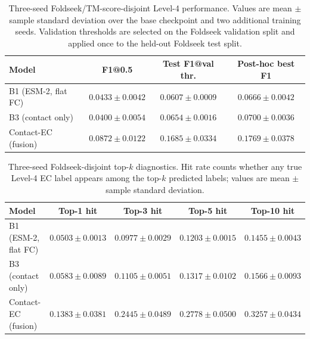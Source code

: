 \documentclass[11pt,a4paper]{article}
\begin{document}
\begin{table}[htbp]
\centering
\caption{Three-seed Foldseek/TM-score-disjoint Level-4 performance. Values are
mean $\pm$ sample standard deviation over the base checkpoint and two additional
training seeds. Validation thresholds are selected on the Foldseek validation
split and applied once to the held-out Foldseek test split.}
\label{tab:foldseek_seed_repeats}
\small
\setlength{\tabcolsep}{4pt}
\begin{tabular}{lccc}
\toprule
Model & F1@0.5 & Test F1@val thr. & Post-hoc best F1 \\
\midrule
B1 (ESM-2, flat FC) & $0.0433\pm0.0042$ & $0.0607\pm0.0009$ & $0.0666\pm0.0042$ \\
B3 (contact only) & $0.0400\pm0.0054$ & $0.0654\pm0.0016$ & $0.0700\pm0.0036$ \\
Contact-EC (fusion) & $\mathbf{0.0872\pm0.0122}$ & $\mathbf{0.1685\pm0.0334}$ & $\mathbf{0.1769\pm0.0378}$ \\
\bottomrule
\end{tabular}
\end{table}

\begin{table}[htbp]
\centering
\caption{Three-seed Foldseek-disjoint top-$k$ diagnostics. Hit rate counts
whether any true Level-4 EC label appears among the top-$k$ predicted labels;
values are mean $\pm$ sample standard deviation.}
\label{tab:foldseek_topk}
\small
\setlength{\tabcolsep}{5pt}
\begin{tabular}{lcccc}
\toprule
Model & Top-1 hit & Top-3 hit & Top-5 hit & Top-10 hit \\
\midrule
B1 (ESM-2, flat FC) & $0.0503\pm0.0013$ & $0.0977\pm0.0029$ & $0.1203\pm0.0015$ & $0.1455\pm0.0043$ \\
B3 (contact only) & $0.0583\pm0.0089$ & $0.1105\pm0.0051$ & $0.1317\pm0.0102$ & $0.1566\pm0.0093$ \\
Contact-EC (fusion) & $\mathbf{0.1383\pm0.0381}$ & $\mathbf{0.2445\pm0.0489}$ & $\mathbf{0.2778\pm0.0500}$ & $\mathbf{0.3257\pm0.0434}$ \\
\bottomrule
\end{tabular}
\end{table}
\end{document}
